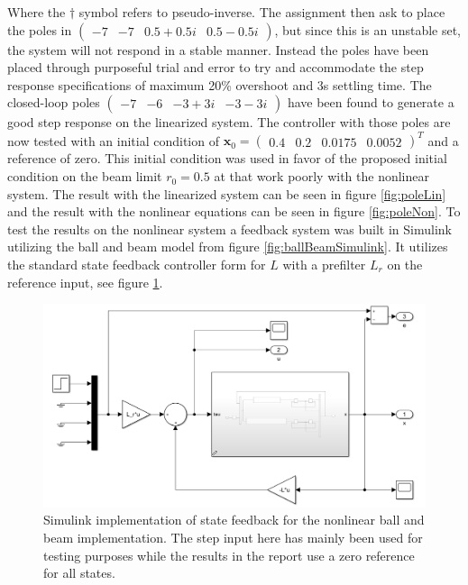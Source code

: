 \documentclass[a4paper, titlepage]{article}
\begin{document}
Where the $\dagger$ symbol refers to pseudo-inverse.
The assignment then ask to place the poles in $\begin{pmatrix} -7 & -7 & 0.5+0.5i & 0.5-0.5i \end{pmatrix}$, but since this is an unstable set, the system will not respond in a stable manner.
Instead the poles have been placed through purposeful trial and error to try and accommodate the step response specifications of maximum 20\% overshoot and 3s settling time.
The closed-loop poles $\begin{pmatrix} -7 & -6 & -3+3i & -3-3i \end{pmatrix}$ have been found to generate a good step response on the linearized system.
The controller with those poles are now tested with an initial condition of $\textbf{x}_0 = \begin{pmatrix} 0.4 & 0.2 & 0.0175 & 0.0052 \end{pmatrix}^T$ and a reference of zero.
This initial condition was used in favor of the proposed initial condition on the beam limit $r_0 = 0.5$ at that work poorly with the nonlinear system.
The result with the linearized system can be seen in figure \ref{fig:poleLin} and the result with the nonlinear equations can be seen in figure \ref{fig:poleNon}.
To test the results on the nonlinear system a feedback system was built in Simulink utilizing the ball and beam model from figure \ref{fig:ballBeamSimulink}.
It utilizes the standard state feedback controller form for $L$ with a prefilter $L_r$ on the reference input, see figure \ref{fig:feedbackSys}.

\begin{figure}[h!]
\center
\includegraphics[scale=0.4]{../figures/feedbackSystemSimulink.png}
\caption{Simulink implementation of state feedback for the nonlinear ball and beam implementation. The step input here has mainly been used for testing purposes while the results in the report use a zero reference for all states.}
\label{fig:feedbackSys}
\end{figure}
\end{document}
